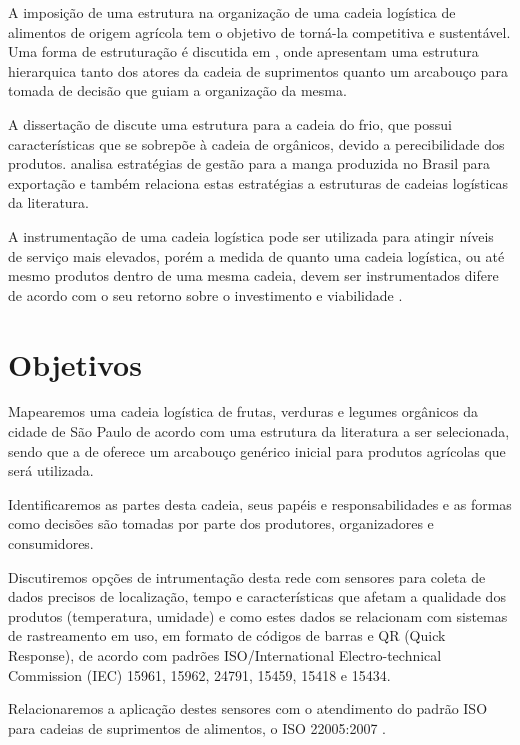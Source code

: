 \documentclass[
	12pt,				%
	openright,			%
	oneside,			%
	a4paper,			%
	english,			%
	french,				%
	spanish,			%
	brazil,				%
	]{abntex2}
\begin{document}
A imposição de uma estrutura na organização de uma cadeia logística de alimentos de origem agrícola tem o objetivo de torná-la competitiva e sustentável. Uma forma de estruturação é discutida em , onde apresentam uma estrutura hierarquica tanto dos atores da cadeia de suprimentos quanto um arcabouço para tomada de decisão que guiam a organização da mesma.

A dissertação de  discute uma estrutura para a cadeia do frio, que possui características que se sobrepõe à cadeia de orgânicos, devido a perecibilidade dos produtos.  analisa estratégias de gestão para a manga produzida no Brasil para exportação e também relaciona estas estratégias a estruturas de cadeias logísticas da literatura.

A instrumentação de uma cadeia logística pode ser utilizada para atingir níveis de serviço mais elevados, porém a medida de quanto uma cadeia logística, ou até mesmo produtos dentro de uma mesma cadeia, devem ser instrumentados difere de acordo com o seu retorno sobre o investimento e viabilidade .

\chapter{Objetivos}

Mapearemos uma cadeia logística de frutas, verduras e legumes orgânicos da cidade de São Paulo de acordo com uma estrutura da literatura a ser selecionada, sendo que a de  oferece um arcabouço genérico inicial para produtos agrícolas que será utilizada.

Identificaremos as partes desta cadeia, seus papéis e responsabilidades e as formas como decisões são tomadas por parte dos produtores, organizadores e consumidores.

Discutiremos opções de intrumentação desta rede com sensores para coleta de dados precisos de localização, tempo e características que afetam a qualidade dos produtos (temperatura, umidade) e como estes dados se relacionam com sistemas de rastreamento em uso, em formato de códigos de barras e QR (Quick Response), de acordo com padrões ISO/International Electro-technical Commission (IEC) 15961, 15962, 24791, 15459, 15418 e 15434.

Relacionaremos a aplicação destes sensores com o atendimento do padrão ISO para cadeias de suprimentos de alimentos, o ISO 22005:2007 .
\end{document}
